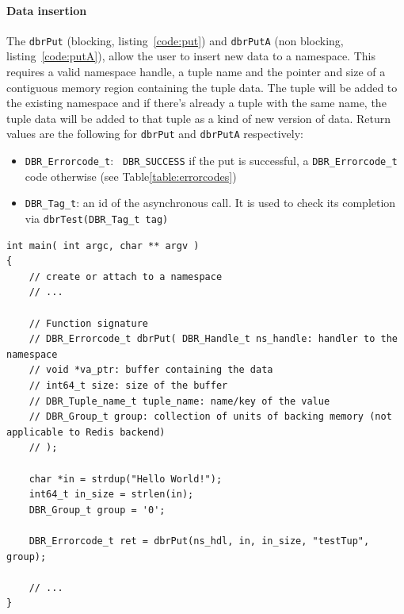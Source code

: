 \paragraph{Data insertion} The \texttt{dbrPut} (blocking, listing~\ref{code:put}) and \texttt{dbrPutA}
(non blocking, listing~\ref{code:putA}), allow the user to insert new data to a namespace.  This
requires a valid namespace handle, a tuple name and the pointer and
size of a contiguous memory region containing the tuple data.  The
tuple will be added to the existing namespace and if there's already a
tuple with the same name, the tuple data will be added to that tuple
as a kind of new version of data.
Return values are the following  for \texttt{dbrPut} and \texttt{dbrPutA} respectively:
\begin{itemize}
	\item \texttt{DBR\_Errorcode\_t}: \texttt{ DBR\_SUCCESS} if the put is successful, a \texttt{DBR\_Errorcode\_t} code otherwise (see Table\ref{table:errorcodes}) 
	\item \texttt{DBR\_Tag\_t}: an id of the asynchronous call. It is used to check its completion via \texttt{dbrTest(DBR\_Tag\_t tag)}
\end{itemize}

\begin{lstlisting}[style=mystyle,basicstyle=\scriptsize\ttfamily,caption=Put data into the namespace (blocking), label=code:put]
int main( int argc, char ** argv )
{
	// create or attach to a namespace
	// ...
	
    // Function signature
    // DBR_Errorcode_t dbrPut( DBR_Handle_t ns_handle: handler to the namespace
    // void *va_ptr: buffer containing the data
    // int64_t size: size of the buffer
    // DBR_Tuple_name_t tuple_name: name/key of the value
    // DBR_Group_t group: collection of units of backing memory (not applicable to Redis backend)
    // );
    
    char *in = strdup("Hello World!");
    int64_t in_size = strlen(in);
    DBR_Group_t group = '0';
    
    DBR_Errorcode_t ret = dbrPut(ns_hdl, in, in_size, "testTup", group);
	
	// ...
}
\end{lstlisting}

